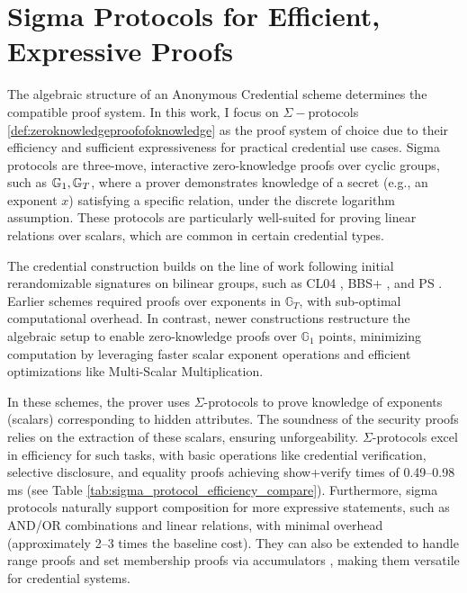 \section{Sigma Protocols for Efficient, Expressive Proofs}\label{chap2:expressive_proofs}

The algebraic structure of an Anonymous Credential scheme determines the compatible proof system. In this work, I focus on $\Sigma-$protocols \ref{def:zeroknowledgeproofofoknowledge} as the proof system of choice due to their efficiency and sufficient expressiveness for practical credential use cases. Sigma protocols are three-move, interactive zero-knowledge proofs over cyclic groups, such as $\mathbb{G}_1, \mathbb{G}_T$, where a prover demonstrates knowledge of a secret (e.g., an exponent $x$) satisfying a specific relation, under the discrete logarithm assumption. These protocols are particularly well-suited for proving linear relations over scalars, which are common in certain credential types. 

The credential construction builds on the line of work following initial rerandomizable signatures on bilinear groups, such as  CL04 \cite{hutchison_signature_2004}, BBS+ \cite{hutchison_constant-size_2006, camenisch_anonymous_2016, tessaro_revisiting_2023}, and PS \cite{sako_short_2016, tomescu_utt_2022}. Earlier schemes \cite{hutchison_signature_2004, hutchison_constant-size_2006, sako_short_2016} required proofs over exponents in $\mathbb{G}_T$, with sub-optimal computational overhead. In contrast, newer constructions \cite{camenisch_anonymous_2016, tessaro_revisiting_2023, tomescu_utt_2022} restructure the algebraic setup to enable zero-knowledge proofs over $\mathbb{G}_1$ points, minimizing computation by leveraging faster scalar exponent operations and efficient optimizations like Multi-Scalar Multiplication. 

In these schemes, the prover uses $\Sigma$-protocols to prove knowledge of exponents (scalars) corresponding to hidden attributes. The soundness of the security proofs relies on the extraction of these scalars, ensuring unforgeability. $\Sigma$-protocols excel in efficiency for such tasks, with basic operations like credential verification, selective disclosure, and equality proofs achieving show+verify times of 0.49--0.98 ms (see Table \ref{tab:sigma_protocol_efficiency_compare}). Furthermore, sigma protocols naturally support composition for more expressive statements, such as AND/OR combinations and linear relations, with minimal overhead (approximately 2--3 times the baseline cost). They can also be extended to handle range proofs \cite{bunz_bulletproofs_2017} and set membership proofs via accumulators \cite{goos_dynamic_2002, jaques_allosaur_2024}, making them versatile for credential systems.

